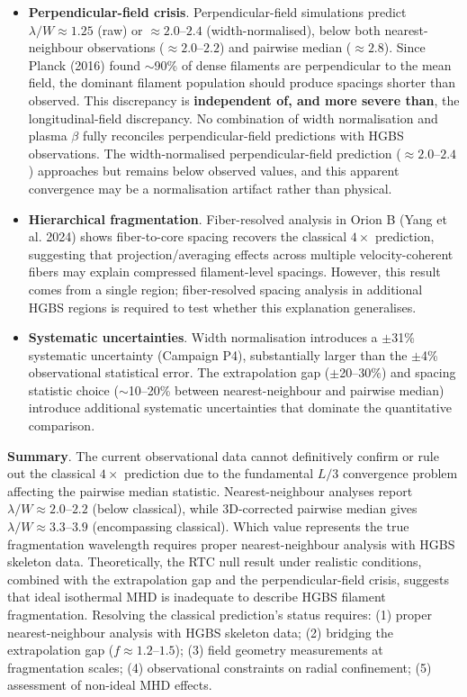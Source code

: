 \documentclass[twocolumn,longtitle,usenatbib]{mnras}
\begin{document}
\begin{itemize}
    \item \textbf{Perpendicular-field crisis}. Perpendicular-field simulations predict $\lambda/W \approx 1.25$ (raw) or $\approx 2.0$--$2.4$ (width-normalised), below both nearest-neighbour observations ($\approx 2.0$--$2.2$) and pairwise median ($\approx 2.8$). Since Planck (2016) found $\sim$90\% of dense filaments are perpendicular to the mean field, the dominant filament population should produce spacings shorter than observed. This discrepancy is \textbf{independent of, and more severe than}, the longitudinal-field discrepancy. No combination of width normalisation and plasma $\beta$ fully reconciles perpendicular-field predictions with HGBS observations. The width-normalised perpendicular-field prediction ($\approx 2.0$--$2.4$) approaches but remains below observed values, and this apparent convergence may be a normalisation artifact rather than physical.

    \item \textbf{Hierarchical fragmentation}. Fiber-resolved analysis in Orion B (Yang et al. 2024) shows fiber-to-core spacing recovers the classical $4\times$ prediction, suggesting that projection/averaging effects across multiple velocity-coherent fibers may explain compressed filament-level spacings. However, this result comes from a single region; fiber-resolved spacing analysis in additional HGBS regions is required to test whether this explanation generalises.

    \item \textbf{Systematic uncertainties}. Width normalisation introduces a $\pm$31\% systematic uncertainty (Campaign P4), substantially larger than the $\pm$4\% observational statistical error. The extrapolation gap ($\pm$20--30\%) and spacing statistic choice ($\sim$10--20\% between nearest-neighbour and pairwise median) introduce additional systematic uncertainties that dominate the quantitative comparison.
\end{itemize}

\textbf{Summary}. The current observational data cannot definitively confirm or rule out the classical $4\times$ prediction due to the fundamental $L/3$ convergence problem affecting the pairwise median statistic. Nearest-neighbour analyses report $\lambda/W \approx 2.0$--$2.2$ (below classical), while 3D-corrected pairwise median gives $\lambda/W \approx 3.3$--$3.9$ (encompassing classical). Which value represents the true fragmentation wavelength requires proper nearest-neighbour analysis with HGBS skeleton data. Theoretically, the RTC null result under realistic conditions, combined with the extrapolation gap and the perpendicular-field crisis, suggests that ideal isothermal MHD is inadequate to describe HGBS filament fragmentation. Resolving the classical prediction's status requires: (1) proper nearest-neighbour analysis with HGBS skeleton data; (2) bridging the extrapolation gap ($f \approx 1.2$--$1.5$); (3) field geometry measurements at fragmentation scales; (4) observational constraints on radial confinement; (5) assessment of non-ideal MHD effects.
\end{document}
